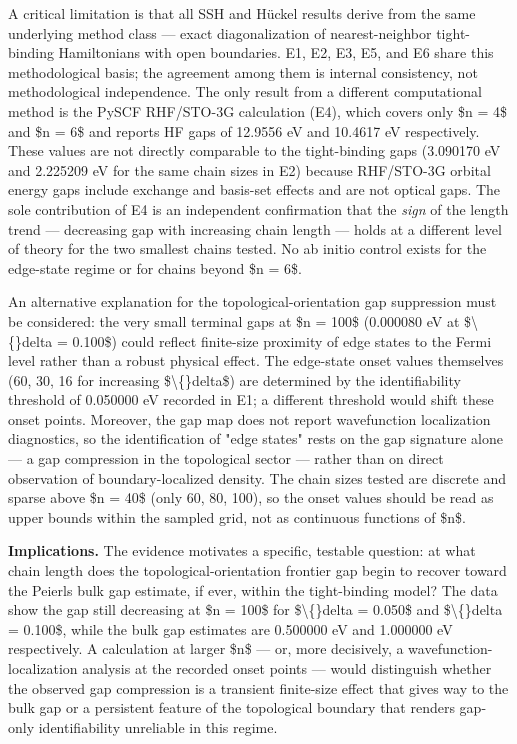 \documentclass[11pt,a4paper]{article}
\begin{document}
A critical limitation is that all SSH and Hückel results derive from the same underlying method class — exact diagonalization of nearest-neighbor tight-binding Hamiltonians with open boundaries. E1, E2, E3, E5, and E6 share this methodological basis; the agreement among them is internal consistency, not methodological independence. The only result from a different computational method is the PySCF RHF/STO-3G calculation (E4), which covers only \$n = 4\$ and \$n = 6\$ and reports HF gaps of 12.9556 eV and 10.4617 eV respectively. These values are not directly comparable to the tight-binding gaps (3.090170 eV and 2.225209 eV for the same chain sizes in E2) because RHF/STO-3G orbital energy gaps include exchange and basis-set effects and are not optical gaps. The sole contribution of E4 is an independent confirmation that the \textit{sign} of the length trend — decreasing gap with increasing chain length — holds at a different level of theory for the two smallest chains tested. No ab initio control exists for the edge-state regime or for chains beyond \$n = 6\$.

An alternative explanation for the topological-orientation gap suppression must be considered: the very small terminal gaps at \$n = 100\$ (0.000080 eV at \$\textbackslash\{\}delta = 0.100\$) could reflect finite-size proximity of edge states to the Fermi level rather than a robust physical effect. The edge-state onset values themselves (60, 30, 16 for increasing \$\textbackslash\{\}delta\$) are determined by the identifiability threshold of 0.050000 eV recorded in E1; a different threshold would shift these onset points. Moreover, the gap map does not report wavefunction localization diagnostics, so the identification of "edge states" rests on the gap signature alone — a gap compression in the topological sector — rather than on direct observation of boundary-localized density. The chain sizes tested are discrete and sparse above \$n = 40\$ (only 60, 80, 100), so the onset values should be read as upper bounds within the sampled grid, not as continuous functions of \$n\$.

\textbf{Implications.} The evidence motivates a specific, testable question: at what chain length does the topological-orientation frontier gap begin to recover toward the Peierls bulk gap estimate, if ever, within the tight-binding model? The data show the gap still decreasing at \$n = 100\$ for \$\textbackslash\{\}delta = 0.050\$ and \$\textbackslash\{\}delta = 0.100\$, while the bulk gap estimates are 0.500000 eV and 1.000000 eV respectively. A calculation at larger \$n\$ — or, more decisively, a wavefunction-localization analysis at the recorded onset points — would distinguish whether the observed gap compression is a transient finite-size effect that gives way to the bulk gap or a persistent feature of the topological boundary that renders gap-only identifiability unreliable in this regime.
\end{document}
